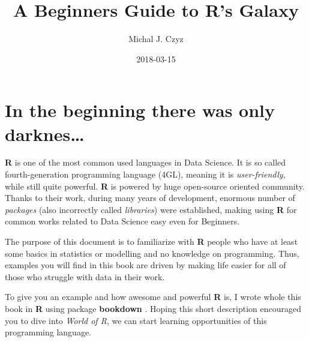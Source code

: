 \documentclass[]{tufte-book}
\title{A Beginners Guide to R's Galaxy}
\author{Michal J. Czyz}
\date{2018-03-15}
\theoremstyle{definition}
\theoremstyle{definition}
\theoremstyle{definition}
\theoremstyle{remark}
\begin{document}
\maketitle



{
\hypersetup{linkcolor=black}
\setcounter{tocdepth}{1}
\tableofcontents
}

\chapter{In the beginning there was only
darknes\ldots{}}\label{in-the-beginning-there-was-only-darknes}

\textbf{R} \citep{rcore2017} is one of the most common used languages in
Data Science. It is so called fourth-generation programming language
(4GL), meaning it is \emph{user-friendly}, while still quite powerful.
\textbf{R} is powered by huge open-source oriented community. Thanks to
their work, during many years of development, enormous number of
\emph{packages} (also incorrectly called \emph{libraries}) were
established, making using \textbf{R} for common works related to Data
Science easy even for Beginners.

The purpose of this document is to familiarize with \textbf{R} people
who have at least some basics in statistics or modelling and no
knowledge on programming. Thus, examples you will find in this book are
driven by making life easier for all of those who struggle with data in
their work.

To give you an example and how awesome and powerful \textbf{R} is, I
wrote whole this book in \textbf{R} using package \textbf{bookdown}
\citep{xie2016, R-bookdown}. Hoping this short description encouraged
you to dive into \emph{World of R}, we can start learning opportunities
of this programming language.


\end{document}
